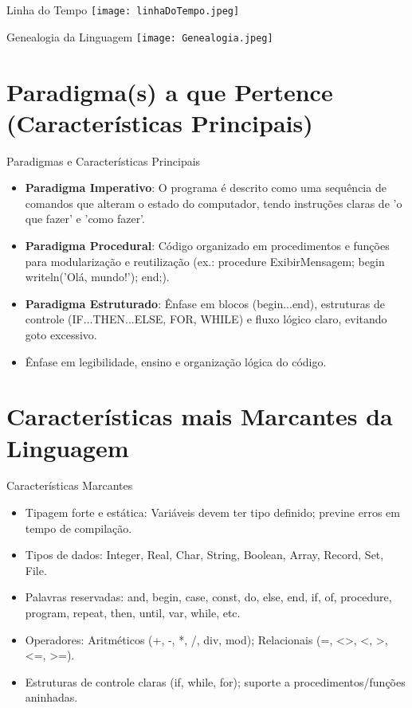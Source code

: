\documentclass{beamer}
\begin{document}
\begin{frame}{Linha do Tempo}
    \texttt{[image: linhaDoTempo.jpeg]}
\end{frame}

\begin{frame}{Genealogia da Linguagem}
    \centering
    \texttt{[image: Genealogia.jpeg]}
\end{frame}

\section{Paradigma(s) a que Pertence (Características Principais)}
\begin{frame}{Paradigmas e Características Principais}
\begin{itemize}
\item \textbf{Paradigma Imperativo}: O programa é descrito como uma sequência de comandos que alteram o estado do computador, tendo instruções claras de 'o que fazer' e 'como fazer'.
\item \textbf{Paradigma Procedural}: Código organizado em procedimentos e funções para modularização e reutilização (ex.: procedure ExibirMensagem; begin writeln('Olá, mundo!'); end;).
\item \textbf{Paradigma Estruturado}: Ênfase em blocos (begin...end), estruturas de controle (IF...THEN...ELSE, FOR, WHILE) e fluxo lógico claro, evitando goto excessivo.
\item Ênfase em legibilidade, ensino e organização lógica do código.
\end{itemize}
\end{frame}
\section{Características mais Marcantes da Linguagem}
\begin{frame}{Características Marcantes}
\begin{itemize}
\item Tipagem forte e estática: Variáveis devem ter tipo definido; previne erros em tempo de compilação.
\item Tipos de dados: Integer, Real, Char, String, Boolean, Array, Record, Set, File.
\item Palavras reservadas: and, begin, case, const, do, else, end, if, of, procedure, program, repeat, then, until, var, while, etc.
\item Operadores: Aritméticos (+, -, *, /, div, mod); Relacionais (=, <>, <, >, <=, >=).
\item Estruturas de controle claras (if, while, for); suporte a procedimentos/funções aninhadas.
\end{itemize}
\end{frame}
\end{document}
